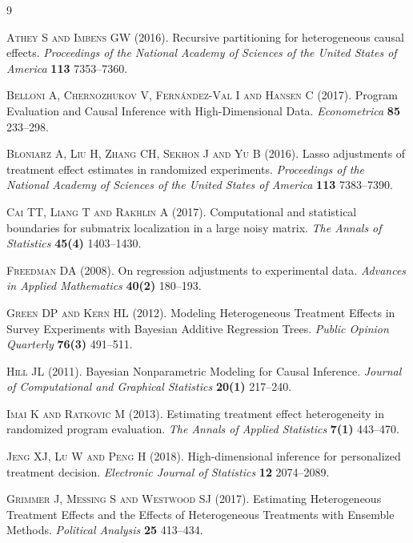 \documentclass[11pt,paper=letter]{scrartcl}
\begin{document}
\begin{thebibliography}{9}



\textsc{Athey S and Imbens GW} (2016).
Recursive partitioning for heterogeneous causal effects.
\textit{Proceedings of the National Academy of Sciences of the United States of America}
\textbf{113} 7353--7360.



\textsc{Belloni A, Chernozhukov V, Fern\'andez-Val I and Hansen C} (2017).
Program Evaluation and Causal Inference with High-Dimensional Data.
\textit{Econometrica}
\textbf{85} 233--298.



\textsc{Bloniarz A, Liu H, Zhang CH, Sekhon J and Yu B} (2016).
Lasso adjustments of treatment effect estimates in randomized experiments.
\textit{Proceedings of the National Academy of Sciences of the United States of America}
\textbf{113} 7383--7390.



\textsc{Cai TT, Liang T and Rakhlin A} (2017).
Computational and statistical boundaries for submatrix localization in a large noisy matrix.
\textit{The Annals of Statistics}
\textbf{45(4)} 1403--1430.


\textsc{Freedman DA} (2008).
On regression adjustments to experimental data.
\textit{Advances in Applied Mathematics}
\textbf{40(2)} 180--193.


\textsc{Green DP and Kern HL} (2012).
Modeling Heterogeneous Treatment Effects in Survey Experiments with Bayesian Additive Regression Trees.
\textit{Public Opinion Quarterly}
\textbf{76(3)} 491--511.


\textsc{Hill JL} (2011).
Bayesian Nonparametric Modeling for Causal Inference.
\textit{Journal of Computational and Graphical Statistics}
\textbf{20(1)} 217--240.


\textsc{Imai K and Ratkovic M} (2013).
Estimating treatment effect heterogeneity in randomized program evaluation.
\textit{The Annals of Applied Statistics}
\textbf{7(1)} 443--470.


\textsc{Jeng XJ, Lu W and Peng H} (2018).
High-dimensional inference for personalized treatment decision.
\textit{Electronic Journal of Statistics}
\textbf{12} 2074--2089.


\textsc{Grimmer J, Messing S and Westwood SJ} (2017).
Estimating Heterogeneous Treatment Effects and the Effects of Heterogeneous Treatments with Ensemble Methods.
\textit{Political Analysis}
\textbf{25} 413--434.



\end{thebibliography}
\end{document}
